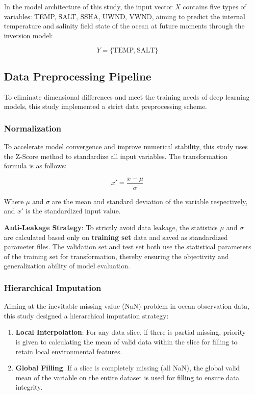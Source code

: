 \documentclass[webpdf,contemporary,large]{oup-authoring-template}
\begin{document}
In the model architecture of this study, the input vector $X$ contains five types of variables: TEMP, SALT, SSHA, UWND, VWND, aiming to predict the internal temperature and salinity field state of the ocean at future moments through the inversion model:

\begin{equation}
Y = \{ \text{TEMP}, \text{SALT} \}
\end{equation}

\subsection{Data Preprocessing Pipeline}

To eliminate dimensional differences and meet the training needs of deep learning models, this study implemented a strict data preprocessing scheme.

\subsubsection{Normalization}

To accelerate model convergence and improve numerical stability, this study uses the Z-Score method to standardize all input variables. The transformation formula is as follows:

\begin{equation}
x' = \frac{x - \mu}{\sigma}
\end{equation}

Where $\mu$ and $\sigma$ are the mean and standard deviation of the variable respectively, and $x'$ is the standardized input value.

\textbf{Anti-Leakage Strategy}: To strictly avoid data leakage, the statistics $\mu$ and $\sigma$ are calculated based only on \textbf{training set} data and saved as standardized parameter files. The validation set and test set both use the statistical parameters of the training set for transformation, thereby ensuring the objectivity and generalization ability of model evaluation.

\subsubsection{Hierarchical Imputation}

Aiming at the inevitable missing value (NaN) problem in ocean observation data, this study designed a hierarchical imputation strategy:

\begin{enumerate}
\renewcommand{\labelenumi}{\alph{enumi})}
\item \textbf{Local Interpolation}: For any data slice, if there is partial missing, priority is given to calculating the mean of valid data within the slice for filling to retain local environmental features.
\item \textbf{Global Filling}: If a slice is completely missing (all NaN), the global valid mean of the variable on the entire dataset is used for filling to ensure data integrity.
\end{enumerate}
\end{document}

